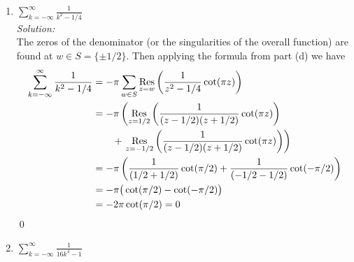 \documentclass[10pt]{amsart}
\theoremstyle{nonumberplain}
\begin{document}
\begin{enumerate}[label={\bf {\arabic*}:}]
\begin{enumerate}
\begin{enumerate}
\item  $\displaystyle \sum_{k=-\infty}^{\infty} \frac{1}{k^2-1/4}$ \\
 
\noindent
\textit{Solution:} \\
The zeros of the denominator (or the singularities of the overall function) are found at $w \in S = \{ \pm 1/2 \}$.
Then applying the formula from part (d) we have
\begin{align*}
\sum_{k=-\infty}^{\infty} \frac{1}{k^2-1/4}
	&= - \pi \sum_{w \in S} \underset{z=w}{ \rm Res} \left( \frac{1}{z^2-1/4} \cot (\pi z) \right) \\
	&= - \pi \left( \underset{z=1/2}{ \rm Res} \left( \frac{1}{(z - 1/2)( z + 1/2)} \cot (\pi z) \right) \right. \\
		& \quad \quad +\left. \underset{z=-1/2}{ \rm Res} \left( \frac{1}{(z - 1/2)( z + 1/2)} \cot (\pi z) \right)\right) \\
	&= - \pi \left( \frac{1}{( 1/2 + 1/2)} \cot (\pi / 2) + \frac{1}{(-1/2 - 1/2)} \cot (-\pi /2) \right) \\
	&= - \pi \big( \cot (\pi / 2) -\cot (-\pi /2) \big) \\
	&= - 2 \pi \cot (\pi / 2) = 0
\end{align*}
\qed \\
\newpage

\item  $\displaystyle \sum_{k=-\infty}^{\infty} \frac{1}{16k^4 - 1}$ \\
 

\end{enumerate}
\end{enumerate}
\end{enumerate}
\end{document}
